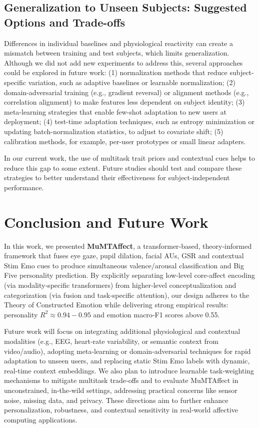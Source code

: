 \documentclass[sigconf]{acmart}
\begin{document}
\subsection{Generalization to Unseen Subjects: Suggested Options and Trade-offs}
Differences in individual baselines and physiological reactivity can create a mismatch between training and test subjects, which limits generalization. Although we did not add new experiments to address this, several approaches could be explored in future work:  
(1) normalization methods that reduce subject-specific variation, such as adaptive baselines or learnable normalization;  
(2) domain-adversarial training (e.g., gradient reversal) or alignment methods (e.g., correlation alignment) to make features less dependent on subject identity;  
(3) meta-learning strategies that enable few-shot adaptation to new users at deployment;  
(4) test-time adaptation techniques, such as entropy minimization or updating batch-normalization statistics, to adjust to covariate shift;  
(5) calibration methods, for example, per-user prototypes or small linear adapters.  

In our current work, the use of multitask trait priors and contextual cues helps to reduce this gap to some extent. Future studies should test and compare these strategies to better understand their effectiveness for subject-independent performance.




\section{Conclusion and Future Work}

In this work, we presented \textbf{MuMTAffect}, a transformer‑based, theory‑informed framework that fuses eye gaze, pupil dilation, facial AUs, GSR and contextual Stim Emo cues to produce simultaneous valence/arousal classification and Big Five personality prediction. By explicitly separating low‑level core‑affect encoding (via modality‑specific transformers) from higher‑level conceptualization and categorization (via fusion and task‑specific attention), our design adheres to the Theory of Constructed Emotion while delivering strong empirical results: personality $R^2\approx0.94\!-\!0.95$ and emotion macro‑F1 scores above 0.55. 

Future work will focus on integrating additional physiological and contextual modalities (e.g., EEG, heart‑rate variability, or semantic context from video/audio), adopting meta‑learning or domain‑adversarial techniques for rapid adaptation to unseen users, and replacing static Stim Emo labels with dynamic, real‑time context embeddings. We also plan to introduce learnable task‑weighting mechanisms to mitigate multitask trade‑offs and to evaluate MuMTAffect in unconstrained, in‑the‑wild settings, addressing practical concerns like sensor noise, missing data, and privacy. These directions aim to further enhance personalization, robustness, and contextual sensitivity in real‑world affective computing applications.
\end{document}
